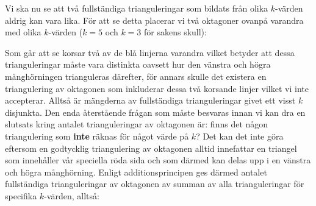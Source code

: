 \documentclass{tufte-handout}
\begin{document}
\begin{ans}
    Vi ska nu se att två fullständiga trianguleringar som bildats från olika $k$-värden aldrig kan vara lika. För att se detta placerar vi två oktagoner ovanpå varandra med olika $k$-värden ($k = 5$ och $k = 3$ för sakens skull):

    \begin{center}
    \end{center}

    Som går att se korsar två av de blå linjerna varandra vilket betyder att dessa trianguleringar måste vara distinkta oavsett hur den vänstra och högra månghörningen trianguleras därefter, för annars skulle det existera en triangulering av oktagonen som inkluderar dessa två korsande linjer vilket vi inte accepterar. Alltså är mängderna av fullständiga trianguleringar givet ett visst $k$ disjunkta. Den enda återstående frågan som måste besvaras innan vi kan dra en slutsats kring antalet trianguleringar av oktagonen är: finns det någon triangulering som \textbf{inte} räknas för något värde på $k$? Det kan det inte göra eftersom en godtycklig triangulering av oktagonen alltid innefattar en triangel som innehåller vår speciella röda sida och som därmed kan delas upp i en vänstra och högra månghörning. Enligt additionsprincipen ges därmed antalet fullständiga trianguleringar av oktagonen av summan av alla trianguleringar för specifika $k$-värden, alltså:


\end{ans}
\end{document}
